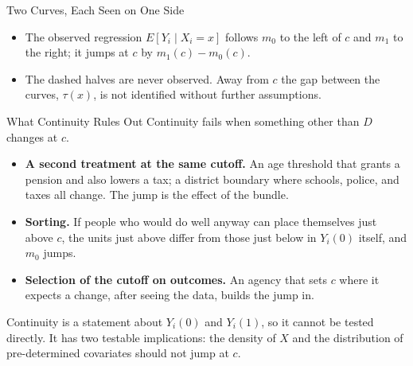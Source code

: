 \documentclass[aspectratio=169,11pt,xcolor=dvipsnames]{beamer}
\newcommand{\E}{E}
\begin{document}
\begin{frame}{Two Curves, Each Seen on One Side}
\begin{center}
\end{center}
\vskip-4pt
\begin{itemize}\itemsep2pt
  \item The observed regression $\E[Y_i\mid X_i=x]$ follows $m_0$ to the left of $c$
        and $m_1$ to the right; it jumps at $c$ by $m_1(c) - m_0(c)$.
  \item The dashed halves are never observed. Away from $c$ the gap between the
        curves, $\tau(x)$, is not identified without further assumptions.
\end{itemize}
\end{frame}

\begin{frame}{What Continuity Rules Out}
Continuity fails when something other than $D$ changes at $c$.
\vskip3pt
\begin{itemize}\itemsep4pt
  \item \textbf{A second treatment at the same cutoff.} An age threshold that
        grants a pension and also lowers a tax; a district boundary where
        schools, police, and taxes all change. The jump is the effect of the
        bundle.
  \item \textbf{Sorting.} If people who would do well anyway can place
        themselves just above $c$, the units just above differ from those just
        below in $Y_i(0)$ itself, and $m_0$ jumps.
  \item \textbf{Selection of the cutoff on outcomes.} An agency that sets $c$ where
        it expects a change, after seeing the data, builds the jump in.
\end{itemize}
\vskip4pt
Continuity is a statement about $Y_i(0)$ and $Y_i(1)$, so it cannot be tested
directly. It has \alert{two testable implications}: the density of $X$ and the
distribution of pre-determined covariates should not jump at $c$.
\end{frame}
\end{document}
